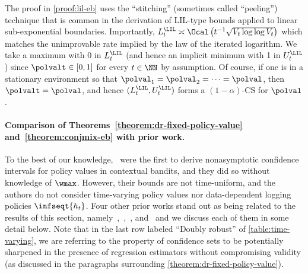 The proof in \cref{proof:lil-eb} uses the ``stitching'' (sometimes called ``peeling'') technique that is common in the derivation of LIL-type bounds \citep{darling1967confidence,jamieson2014lil,kaufmann2016complexity} applied to linear sub-exponential boundaries. Importantly, $L_t^\LIL \asymp \Ocal\left (t^{-1}\sqrt{ V_t \log \log V_t} \right )$ which matches the unimprovable rate implied by the law of the iterated logarithm. We take a maximum with 0 in $L_t^\LIL$ (and hence an implicit minimum with 1 in $U_t^\LIL$) since $\polvalt \in [0, 1]$  for every $t \in \NN$ by assumption. Of course, if one is in a stationary environment so that $\polval_1 = \polval_2 = \cdots = \polval$, then $\polvalt = \polval$, and hence $(L_t^\LIL, U_t^\LIL)$ forms a $(1-\alpha)$-CS for $\polval$.

\paragraph{Comparison of Theorems~\ref{theorem:dr-fixed-policy-value} and~\ref{theorem:conjmix-eb} with prior work.}
To the best of our knowledge,~\citet{thomas2015high} were the first to derive nonasymptotic confidence intervals for policy values in contextual bandits, and they did so without knowledge of $\wmax$. However, their bounds are not time-uniform, and the authors do not consider time-varying policy values nor data-dependent logging policies $\infseqt{h_t}$. Four other prior works stand out as being related to the results of this section, namely~\citet{karampatziakis2021off},~\citet[Section 4.2]{howard2018uniform},~\citet{bibaut2021post}, and~\citet{zhan2021off} and we discuss each of them in some detail below. Note that in the last row labeled ``Doubly robust'' of \cref{table:time-varying}, we are referring to the property of confidence sets to be potentially sharpened in the presence of regression estimators without compromising validity (as discussed in the paragraphs surrounding \cref{theorem:dr-fixed-policy-value}).

